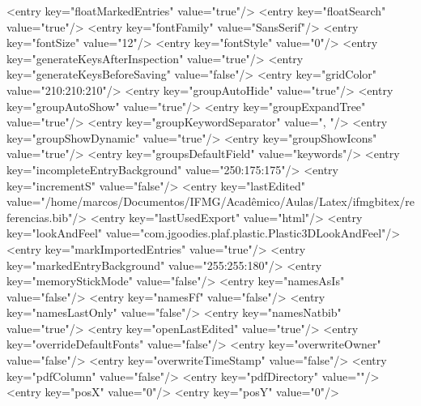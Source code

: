 \begin{codigo}[caption={Código de configuração do programa JabRef em XML}, label={codigo:config-jabref}, language=XML, breaklines=true]
            <entry key="floatMarkedEntries" value="true"/>
            <entry key="floatSearch" value="true"/>
            <entry key="fontFamily" value="SansSerif"/>
            <entry key="fontSize" value="12"/>
            <entry key="fontStyle" value="0"/>
            <entry key="generateKeysAfterInspection" value="true"/>
            <entry key="generateKeysBeforeSaving" value="false"/>
            <entry key="gridColor" value="210:210:210"/>
            <entry key="groupAutoHide" value="true"/>
            <entry key="groupAutoShow" value="true"/>
            <entry key="groupExpandTree" value="true"/>
            <entry key="groupKeywordSeparator" value=", "/>
            <entry key="groupShowDynamic" value="true"/>
            <entry key="groupShowIcons" value="true"/>
            <entry key="groupsDefaultField" value="keywords"/>
            <entry key="incompleteEntryBackground" value="250:175:175"/>
            <entry key="incrementS" value="false"/>
            <entry key="lastEdited" value="/home/marcos/Documentos/IFMG/Acadêmico/Aulas/Latex/ifmgbitex/referencias.bib"/>
            <entry key="lastUsedExport" value="html"/>
            <entry key="lookAndFeel" value="com.jgoodies.plaf.plastic.Plastic3DLookAndFeel"/>
            <entry key="markImportedEntries" value="true"/>
            <entry key="markedEntryBackground" value="255:255:180"/>
            <entry key="memoryStickMode" value="false"/>
            <entry key="namesAsIs" value="false"/>
            <entry key="namesFf" value="false"/>
            <entry key="namesLastOnly" value="false"/>
            <entry key="namesNatbib" value="true"/>
            <entry key="openLastEdited" value="true"/>
            <entry key="overrideDefaultFonts" value="false"/>
            <entry key="overwriteOwner" value="false"/>
            <entry key="overwriteTimeStamp" value="false"/>
            <entry key="pdfColumn" value="false"/>
            <entry key="pdfDirectory" value=""/>
            <entry key="posX" value="0"/>
            <entry key="posY" value="0"/>

\end{codigo}
